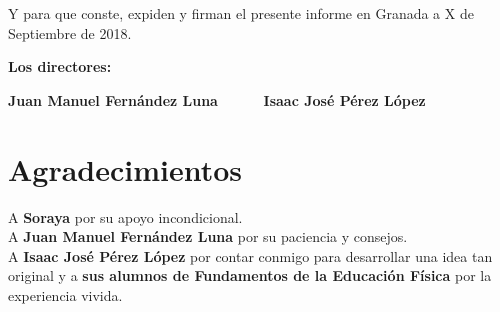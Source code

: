 \vspace{0.5cm}

Y para que conste, expiden y firman el presente informe en Granada a X de Septiembre de 2018.

\vspace{1cm}

\textbf{Los directores:}

\vspace{5cm}

\noindent \textbf{Juan Manuel Fernández Luna \ \ \ \ \ Isaac José Pérez López}

\chapter*{Agradecimientos}
\thispagestyle{empty}

       \vspace{1cm}


A \textbf{Soraya} por su apoyo incondicional.\\

A \textbf{Juan Manuel Fernández Luna} por su paciencia y consejos.\\

A \textbf{Isaac José Pérez López} por contar conmigo para desarrollar una idea tan original y a \textbf{sus alumnos de Fundamentos de la Educación Física} por la experiencia vivida.

